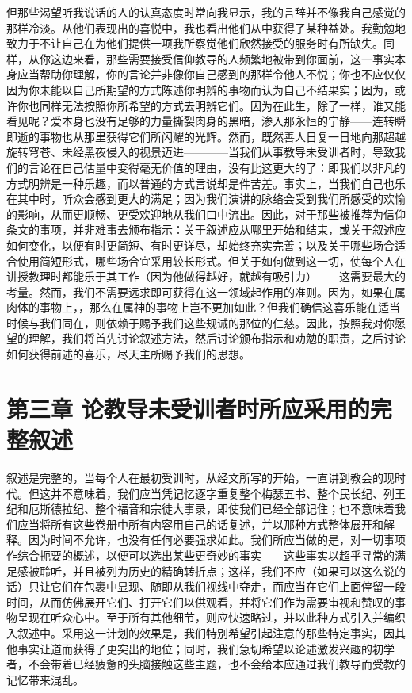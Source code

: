 但那些渴望听我说话的人的认真态度时常向我显示，我的言辞并不像我自己感觉的那样冷淡。从他们表现出的喜悦中，我也看出他们从中获得了某种益处。我勤勉地致力于不让自己在为他们提供一项我所察觉他们欣然接受的服务时有所缺失。同样，从你这边来看，那些需要接受信仰教导的人频繁地被带到你面前，这一事实本身应当帮助你理解，你的言论并非像你自己感到的那样令他人不悦；你也不应仅仅因为你未能以自己所期望的方式陈述你明辨的事物而认为自己不结果实；因为，或许你也同样无法按照你所希望的方式去明辨它们。因为在此生，除了一样，谁又能看见呢？爱本身也没有足够的力量撕裂肉身的黑暗，渗入那永恒的宁静——连转瞬即逝的事物也从那里获得它们所闪耀的光辉。然而，既然善人日复一日地向那超越旋转穹苍、未经黑夜侵入的视景迈进————当我们从事教导未受训者时，导致我们的言论在自己估量中变得毫无价值的理由，没有比这更大的了：即我们以非凡的方式明辨是一种乐趣，而以普通的方式言说却是件苦差。事实上，当我们自己也乐在其中时，听众会感到更大的满足；因为我们演讲的脉络会受到我们所感受的欢愉的影响，从而更顺畅、更受欢迎地从我们口中流出。因此，对于那些被推荐为信仰条文的事项，并非难事去颁布指示：关于叙述应从哪里开始和结束，或关于叙述应如何变化，以便有时更简短、有时更详尽，却始终充实完善；以及关于哪些场合适合使用简短形式，哪些场合宜采用较长形式。但关于如何做到这一切，使每个人在讲授教理时都能乐于其工作（因为他做得越好，就越有吸引力）——这需要最大的考量。然而，我们不需要远求即可获得在这一领域起作用的准则。因为，如果在属肉体的事物上，，那么在属神的事物上岂不更加如此？但我们确信这喜乐能在适当时候与我们同在，则依赖于赐予我们这些规诫的那位的仁慈。因此，按照我对你愿望的理解，我们将首先讨论叙述方法，然后讨论颁布指示和劝勉的职责，之后讨论如何获得前述的喜乐，尽天主所赐予我们的思想。\par


\section{第三章 论教导未受训者时所应采用的完整叙述}

叙述是完整的，当每个人在最初受训时，从经文所写的开始，一直讲到教会的现时代。但这并不意味着，我们应当凭记忆逐字重复整个梅瑟五书、整个民长纪、列王纪和厄斯德拉纪、整个福音和宗徒大事录，即使我们已经全部记住；也不意味着我们应当将所有这些卷册中所有内容用自己的话复述，并以那种方式整体展开和解释。因为时间不允许，也没有任何必要强求如此。我们所应当做的是，对一切事项作综合扼要的概述，以便可以选出某些更奇妙的事实——这些事实以超乎寻常的满足感被聆听，并且被列为历史的精确转折点；这样，我们不应（如果可以这么说的话）只让它们在包裹中显现、随即从我们视线中夺走，而应当在它们上面停留一段时间，从而仿佛展开它们、打开它们以供观看，并将它们作为需要审视和赞叹的事物呈现在听众心中。至于所有其他细节，则应快速略过，并以此种方式引入并编织入叙述中。采用这一计划的效果是，我们特别希望引起注意的那些特定事实，因其他事实让道而获得了更突出的地位；同时，我们急切希望以论述激发兴趣的初学者，不会带着已经疲惫的头脑接触这些主题，也不会给本应通过我们教导而受教的记忆带来混乱。\par

